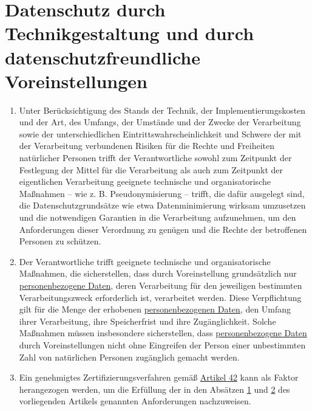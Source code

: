 \chapter{Datenschutz durch Technikgestaltung und durch datenschutzfreundliche Voreinstellungen}
\label{ch:25}


\begin{enumerate}

  \item Unter Berücksichtigung des Stands der Technik, der Implementierungskosten und der Art, des Umfangs, der Umstände
   und der Zwecke der Verarbeitung sowie der unterschiedlichen Eintrittswahrscheinlichkeit und Schwere der mit der
   Verarbeitung verbundenen Risiken für die Rechte und Freiheiten natürlicher Personen trifft der Verantwortliche
   sowohl zum Zeitpunkt der Festlegung der Mittel für die Verarbeitung als auch zum Zeitpunkt der eigentlichen
   Verarbeitung geeignete technische und organisatorische Maßnahmen -- wie z. B. Pseudonymisierung -- trifft, die dafür
   ausgelegt sind, die Datenschutzgrundsätze wie etwa Datenminimierung wirksam umzusetzen und die notwendigen Garantien
   in die Verarbeitung aufzunehmen, um den Anforderungen dieser Verordnung zu genügen und die Rechte der betroffenen
   Personen zu schützen.
  \label{itm:25-1}

  \item Der Verantwortliche trifft geeignete technische und organisatorische Maßnahmen, die sicherstellen, dass durch
   Voreinstellung grundsätzlich nur \hyperref[itm:04-1]{personenbezogene Daten}, deren Verarbeitung für den jeweiligen bestimmten
   Verarbeitungszweck erforderlich ist, verarbeitet werden. Diese Verpflichtung gilt für die Menge der erhobenen
   \hyperref[itm:04-1]{personenbezogenen Daten}, den Umfang ihrer Verarbeitung, ihre Speicherfrist und ihre Zugänglichkeit. Solche Maßnahmen
   müssen insbesondere sicherstellen, dass \hyperref[itm:04-1]{personenbezogene Daten} durch Voreinstellungen nicht ohne Eingreifen der
   Person einer unbestimmten Zahl von natürlichen Personen zugänglich gemacht werden.
  \label{itm:25-2}

  \item Ein genehmigtes Zertifizierungsverfahren gemäß \hyperref[ch:42]{Artikel 42} kann als Faktor herangezogen werden,
   um die Erfüllung der in den Absätzen \hyperref[itm:25-1]{1} und \hyperref[itm:25-2]{2} des vorliegenden Artikels
   genannten Anforderungen nachzuweisen.
  \label{itm:25-3}

\end{enumerate}


